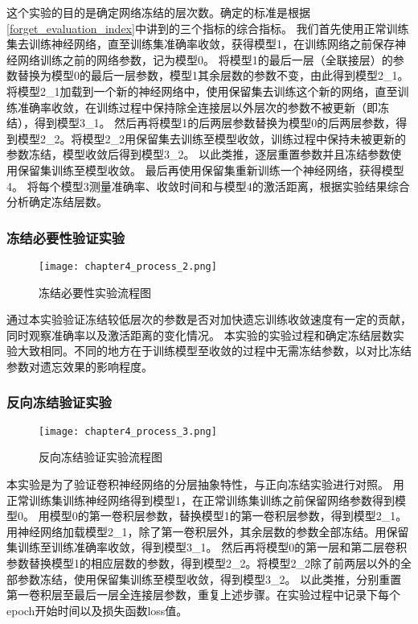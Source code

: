 这个实验的目的是确定网络冻结的层次数。确定的标准是根据\ref{forget_evaluation_index}中讲到的三个指标的综合指标。
我们首先使用正常训练集去训练神经网络，直至训练集准确率收敛，获得模型1，在训练网络之前保存神经网络训练之前的网络参数，记为模型0。
将模型1的最后一层（全联接层）的参数替换为模型0的最后一层参数，模型1其余层数的参数不变，由此得到模型2\_1。
将模型2\_1加载到一个新的神经网络中，使用保留集去训练这个新的网络，直至训练准确率收敛，在训练过程中保持除全连接层以外层次的参数不被更新（即冻结），得到模型3\_1。
然后再将模型1的后两层参数替换为模型0的后两层参数，得到模型2\_2。将模型2\_2用保留集去训练至模型收敛，训练过程中保持未被更新的参数冻结，模型收敛后得到模型3\_2。
以此类推，逐层重置参数并且冻结参数使用保留集训练至模型收敛。
最后再使用保留集重新训练一个神经网络，获得模型4。
将每个模型3测量准确率、收敛时间和与模型4的激活距离，根据实验结果综合分析确定冻结层数。

\subsubsection{冻结必要性验证实验}
\begin{figure}
    \centering
    \texttt{[image: chapter4\_process\_2.png]}
    \caption{冻结必要性实验流程图}
    \label{fig:chapter4_process_2}
\end{figure}

通过本实验验证冻结较低层次的参数是否对加快遗忘训练收敛速度有一定的贡献，同时观察准确率以及激活距离的变化情况。
本实验的实验过程和确定冻结层数实验大致相同。不同的地方在于训练模型至收敛的过程中无需冻结参数，以对比冻结参数对遗忘效果的影响程度。
\subsubsection{反向冻结验证实验}
\begin{figure}
    \centering
    \texttt{[image: chapter4\_process\_3.png]}
    \caption{反向冻结验证实验流程图}
    \label{fig:chapter4_process_3}
\end{figure}

本实验是为了验证卷积神经网络的分层抽象特性，与正向冻结实验进行对照。
用正常训练集训练神经网络得到模型1，在正常训练集训练之前保留网络参数得到模型0。
用模型0的第一卷积层参数，替换模型1的第一卷积层参数，得到模型2\_1。
用神经网络加载模型2\_1，除了第一卷积层外，其余层数的参数全部冻结。用保留集训练至训练准确率收敛，得到模型3\_1。
然后再将模型0的第一层和第二层卷积参数替换模型1的相应层数的参数，得到模型2\_2。将模型2\_2除了前两层以外的全部参数冻结，使用保留集训练至模型收敛，得到模型3\_2。
以此类推，分别重置第一卷积层至最后一层全连接层参数，重复上述步骤。在实验过程中记录下每个epoch开始时间以及损失函数loss值。

